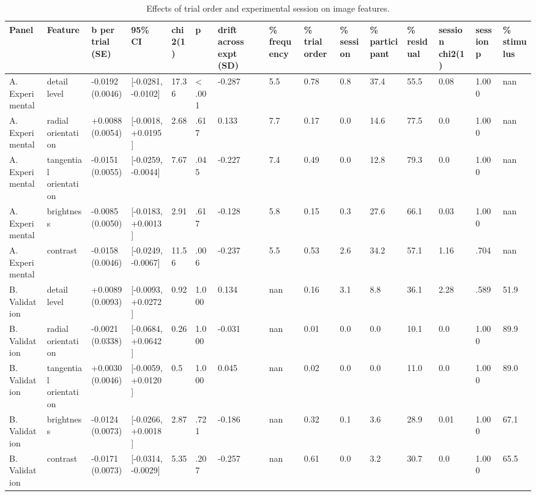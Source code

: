 \begin{table}[htbp]
\centering
\small
\caption{Effects of trial order and experimental session on image features.}
\label{tab:S5.2}
\begin{tabular}{lllllllllllllll}
\hline
Panel & Feature & b per trial (SE) & 95\% CI & chi2(1) & p & drift across expt (SD) & \% frequency & \% trial order & \% session & \% participant & \% residual & session chi2(1) & session p & \% stimulus \\
\hline
A. Experimental & detail level & -0.0192 (0.0046) & [-0.0281, -0.0102] & 17.36 & < .001 & -0.287 & 5.5 & 0.78 & 0.8 & 37.4 & 55.5 & 0.08 & 1.000 & nan \\
A. Experimental & radial orientation & +0.0088 (0.0054) & [-0.0018, +0.0195] & 2.68 & .617 & 0.133 & 7.7 & 0.17 & 0.0 & 14.6 & 77.5 & 0.0 & 1.000 & nan \\
A. Experimental & tangential orientation & -0.0151 (0.0055) & [-0.0259, -0.0044] & 7.67 & .045 & -0.227 & 7.4 & 0.49 & 0.0 & 12.8 & 79.3 & 0.0 & 1.000 & nan \\
A. Experimental & brightness & -0.0085 (0.0050) & [-0.0183, +0.0013] & 2.91 & .617 & -0.128 & 5.8 & 0.15 & 0.3 & 27.6 & 66.1 & 0.03 & 1.000 & nan \\
A. Experimental & contrast & -0.0158 (0.0046) & [-0.0249, -0.0067] & 11.56 & .006 & -0.237 & 5.5 & 0.53 & 2.6 & 34.2 & 57.1 & 1.16 & .704 & nan \\
B. Validation & detail level & +0.0089 (0.0093) & [-0.0093, +0.0272] & 0.92 & 1.000 & 0.134 & nan & 0.16 & 3.1 & 8.8 & 36.1 & 2.28 & .589 & 51.9 \\
B. Validation & radial orientation & -0.0021 (0.0338) & [-0.0684, +0.0642] & 0.26 & 1.000 & -0.031 & nan & 0.01 & 0.0 & 0.0 & 10.1 & 0.0 & 1.000 & 89.9 \\
B. Validation & tangential orientation & +0.0030 (0.0046) & [-0.0059, +0.0120] & 0.5 & 1.000 & 0.045 & nan & 0.02 & 0.0 & 0.0 & 11.0 & 0.0 & 1.000 & 89.0 \\
B. Validation & brightness & -0.0124 (0.0073) & [-0.0266, +0.0018] & 2.87 & .721 & -0.186 & nan & 0.32 & 0.1 & 3.6 & 28.9 & 0.01 & 1.000 & 67.1 \\
B. Validation & contrast & -0.0171 (0.0073) & [-0.0314, -0.0029] & 5.35 & .207 & -0.257 & nan & 0.61 & 0.0 & 3.2 & 30.7 & 0.0 & 1.000 & 65.5 \\
\hline
\end{tabular}
\end{table}